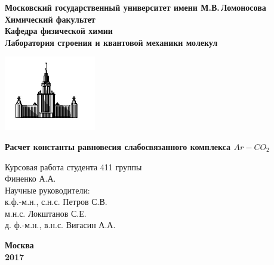\begin{titlepage}
\centering
\textbf{\large Московский государственный университет имени М.В.\,Ломоносова\\
\vspace*{0.1cm} Химический факультет\\
\vspace*{0.1cm}
\noindent\makebox[\linewidth]{\rule{\paperwidth}{0.4pt}}
\vspace*{0.1cm}
 Кафедра физической химии\\
\vspace*{0.1cm} Лаборатория строения и квантовой механики молекул \\}
\vspace*{2cm}

\begin{center}
\includegraphics[width=0.3\textwidth]{pictures/logo.jpg}
\end{center}

\vspace*{2cm}
\Large \textbf{Расчет константы равновесия слабосвязанного комплекса $Ar-CO_2$}
\vspace*{2cm}

\begin{flushright}
\large Курсовая работа студента 411 группы\\
Финенко А.А.\\
\vspace{1cm}
Научные руководители:\\
к.ф.-м.н., с.н.с. Петров С.В. \\
м.н.с. Локштанов С.Е. \\
д. ф.-м.н., в.н.с. Вигасин А.А.
\end{flushright}
\vfill
\large\textbf{Москва\\ 2017}
\end{titlepage}


